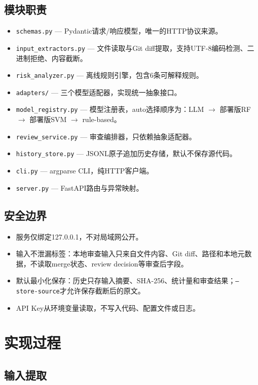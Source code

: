 \documentclass{experimentreport}
\begin{document}
\subsection{模块职责}

\begin{itemize}
  \item \texttt{schemas.py} — Pydantic请求/响应模型，唯一的HTTP协议来源。
  \item \texttt{input\_extractors.py} — 文件读取与Git diff提取，支持UTF-8编码检测、二进制拒绝、内容截断。
  \item \texttt{risk\_analyzer.py} — 离线规则引擎，包含6条可解释规则。
  \item \texttt{adapters/} — 三个模型适配器，实现统一抽象接口。
  \item \texttt{model\_registry.py} — 模型注册表，auto选择顺序为：LLM $\to$ 部署版RF $\to$ 部署版SVM $\to$ rule-based。
  \item \texttt{review\_service.py} — 审查编排器，只依赖抽象适配器。
  \item \texttt{history\_store.py} — JSONL原子追加历史存储，默认不保存源代码。
  \item \texttt{cli.py} — argparse CLI，纯HTTP客户端。
  \item \texttt{server.py} — FastAPI路由与异常映射。
\end{itemize}

\subsection{安全边界}

\begin{itemize}
  \item 服务仅绑定127.0.0.1，不对局域网公开。
  \item 输入不泄漏标签：本地审查输入只来自文件内容、Git diff、路径和本地元数据，不读取merge状态、review decision等审查后字段。
  \item 默认最小化保存：历史只存输入摘要、SHA-256、统计量和审查结果；\texttt{--store-source}才允许保存截断后的原文。
  \item API Key从环境变量读取，不写入代码、配置文件或日志。
\end{itemize}

\section{实现过程}

\subsection{输入提取}
\end{document}
